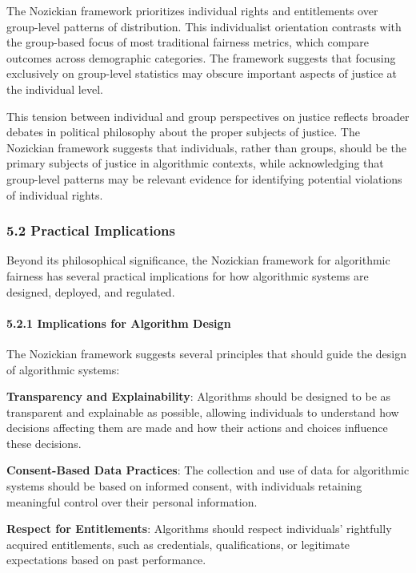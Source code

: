 The Nozickian framework prioritizes individual rights and entitlements
over group-level patterns of distribution. This individualist
orientation contrasts with the group-based focus of most traditional
fairness metrics, which compare outcomes across demographic categories.
The framework suggests that focusing exclusively on group-level
statistics may obscure important aspects of justice at the individual
level.

This tension between individual and group perspectives on justice
reflects broader debates in political philosophy about the proper
subjects of justice. The Nozickian framework suggests that individuals,
rather than groups, should be the primary subjects of justice in
algorithmic contexts, while acknowledging that group-level patterns may
be relevant evidence for identifying potential violations of individual
rights.

\subsubsection{5.2 Practical Implications}\label{practical-implications}

Beyond its philosophical significance, the Nozickian framework for
algorithmic fairness has several practical implications for how
algorithmic systems are designed, deployed, and regulated.

\paragraph{5.2.1 Implications for Algorithm
Design}\label{implications-for-algorithm-design}

The Nozickian framework suggests several principles that should guide
the design of algorithmic systems:

\textbf{Transparency and Explainability}: Algorithms should be designed
to be as transparent and explainable as possible, allowing individuals
to understand how decisions affecting them are made and how their
actions and choices influence these decisions.

\textbf{Consent-Based Data Practices}: The collection and use of data
for algorithmic systems should be based on informed consent, with
individuals retaining meaningful control over their personal
information.

\textbf{Respect for Entitlements}: Algorithms should respect
individuals' rightfully acquired entitlements, such as credentials,
qualifications, or legitimate expectations based on past performance.

